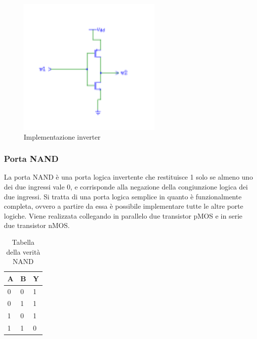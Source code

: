 \documentclass[10pt]{article}
\begin{document}
\begin{itemize}
\begin{figure}[ht]
\begin{minipage}[b]{0.4\textwidth}
    \includegraphics[width=70mm]{inverter}
    \caption{Implementazione inverter}
    \label{ }
    \end{minipage}
    \end{figure}


\subsubsection{Porta NAND}
La porta NAND è una porta logica invertente che restituisce 1 solo se almeno uno dei due ingressi vale 0, e corrisponde alla negazione della congiunzione logica dei due ingressi. 
Si tratta di una porta logica semplice in quanto è funzionalmente completa, ovvero a partire da essa è possibile implementare tutte le altre porte logiche. 
Viene realizzata collegando in parallelo due transistor pMOS e in serie due transistor nMOS.

\begin{table}[H]
    \begin{minipage}[b]{0.4\textwidth}
    \centering
    \begin{tabular}{|ll|l|}
    \hline
    \textbf{A} & \textbf{B} & \textbf{Y} \\ \hline
    0          & 0          & 1          \\ 
    0          & 1          & 1          \\ 
    1          & 0          & 1          \\ 
    1          & 1          & 0          \\ \hline
    \end{tabular}
        \caption{Tabella della verità NAND}
        \label{table:student}
    \end{minipage}
    \end{table}
    
    \begin{figure}[ht]
    \begin{minipage}[b]{0.4\textwidth}
    

\end{minipage}
\end{figure}
\end{itemize}
\end{document}
